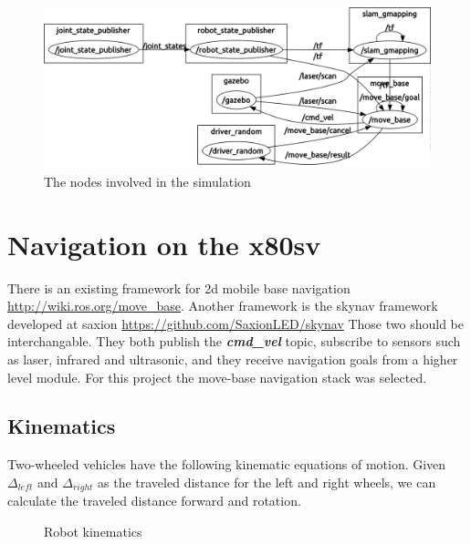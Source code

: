 \documentclass[a4paper]{article}
\newcommand{\rostopic}[1]{\textbf{\textit{#1}}}
\begin{document}
\begin{figure}[h!]
  \centering
  \includegraphics[width=\textwidth,height=\textheight,keepaspectratio]{img/simulatie_nodes.png}
  \caption{The nodes involved in the simulation}
\end{figure}


\section{Navigation on the x80sv}

There is an existing framework for 2d mobile base navigation \url{http://wiki.ros.org/move_base}.
Another framework is the skynav framework developed at saxion \url{https://github.com/SaxionLED/skynav}
Those two should be interchangable. They both publish the \rostopic{cmd\_vel} topic,
subscribe to sensors such as laser, infrared and ultrasonic, and they receive
navigation goals from a higher level module.
For this project the move-base navigation
stack was selected.

\subsection{Kinematics}

Two-wheeled vehicles have the following kinematic equations of motion.
Given $\Delta_{left}$ and $\Delta_{right}$ as the traveled distance for the left and
right wheels, we can calculate the traveled distance forward and rotation.

\begin{figure}[h!]
 \centering
 \caption{Robot kinematics}
\end{figure}
\end{document}
